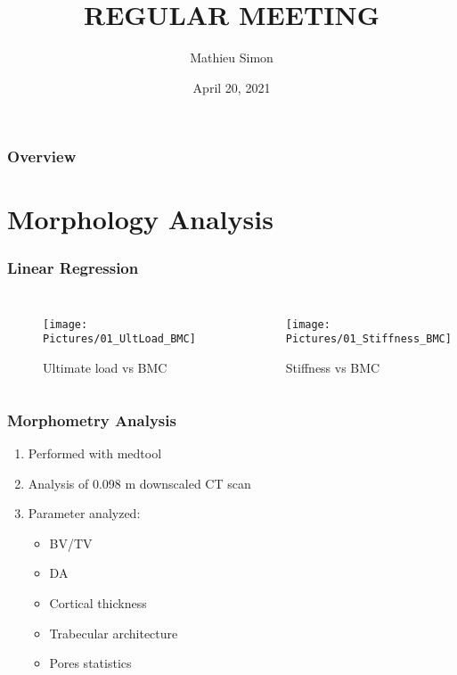 \documentclass[xcolor=table]{beamer}
\title[Regular Meeting]{
\uppercase{Regular Meeting}
}
\author{Mathieu Simon}
\institute[University of Bern]
{
MSc - Biomedical Engineering \\
University of Bern, Faculty of Medicine \\
\medskip
}
\date{April 20, 2021}
\begin{document}
\begin{frame}
\titlepage
\end{frame}


\begin{frame}
	\frametitle{Overview}
	\tableofcontents
\end{frame}


\section{Morphology Analysis}

\begin{frame}
	\frametitle{Linear Regression}
	\begin{columns}
		\centering
		\begin{figure}
			\texttt{[image: Pictures/01\_UltLoad\_BMC]}
			\caption{Ultimate load vs BMC}
		\end{figure}
		\centering
		\begin{figure}
			\texttt{[image: Pictures/01\_Stiffness\_BMC]}
			\caption{Stiffness vs BMC}
		\end{figure}
	\end{columns}
\end{frame}


\begin{frame}
	\frametitle{Morphometry Analysis}
	\begin{enumerate}
		\item Performed with medtool
		\item Analysis of 0.098 \si{\micro}m downscaled \si{\micro}CT scan
		\item Parameter analyzed:
		\begin{itemize}
			\item BV/TV
			\item DA
			\item Cortical thickness
			\item Trabecular architecture
			\item Pores statistics
		\end{itemize}
	\end{enumerate}
\end{frame}
\end{document}
